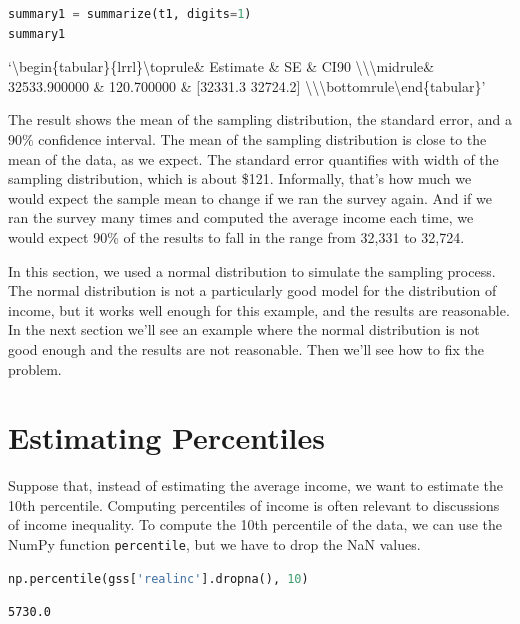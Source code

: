 \begin{lstlisting}[language=Python,style=source]
summary1 = summarize(t1, digits=1)
summary1
\end{lstlisting}

`\textbackslash begin\{tabular\}\{lrrl\}\n\textbackslash toprule\n \&
Estimate \& SE \& CI90
\textbackslash\textbackslash{}\n\textbackslash midrule\n \& 32533.900000
\& 120.700000 \& {[}32331.3 32724.2{]}
\textbackslash\textbackslash{}\n\textbackslash bottomrule\n\textbackslash end\{tabular\}\n'

The result shows the mean of the sampling distribution, the standard
error, and a 90\% confidence interval. The mean of the sampling
distribution is close to the mean of the data, as we expect. The
standard error quantifies with width of the sampling distribution, which
is about \$121. Informally, that's how much we would expect the sample
mean to change if we ran the survey again. And if we ran the survey many
times and computed the average income each time, we would expect 90\% of
the results to fall in the range from 32,331 to 32,724.

In this section, we used a normal distribution to simulate the sampling
process. The normal distribution is not a particularly good model for
the distribution of income, but it works well enough for this example,
and the results are reasonable. In the next section we'll see an example
where the normal distribution is not good enough and the results are not
reasonable. Then we'll see how to fix the problem.

\hypertarget{estimating-percentiles}{%
\section{Estimating Percentiles}\label{estimating-percentiles}}

Suppose that, instead of estimating the average income, we want to
estimate the 10th percentile. Computing percentiles of income is often
relevant to discussions of income inequality. To compute the 10th
percentile of the data, we can use the NumPy function
\passthrough{\lstinline!percentile!}, but we have to drop the NaN
values.

\begin{lstlisting}[language=Python,style=source]
np.percentile(gss['realinc'].dropna(), 10)
\end{lstlisting}

\begin{lstlisting}[style=output]
5730.0
\end{lstlisting}

